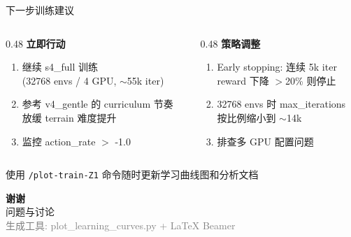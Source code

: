 \documentclass[aspectratio=169, 10pt, xcolor=dvipsnames]{beamer}
\begin{document}
\begin{frame}{下一步训练建议}
  \begin{columns}[T]
    \begin{column}{0.48\textwidth}
      \textbf{立即行动}
      \begin{enumerate}
        \item 继续 s4\_full 训练 \\
              (32768 envs / 4 GPU, $\sim$55k iter)
        \item 参考 v4\_gentle 的 curriculum 节奏 \\
              放缓 terrain 难度提升
        \item 监控 action\_rate $>$ -1.0
      \end{enumerate}
    \end{column}
    \begin{column}{0.48\textwidth}
      \textbf{策略调整}
      \begin{enumerate}
        \item Early stopping: 连续 5k iter \\
              reward 下降 $>$20\% 则停止
        \item 32768 envs 时 max\_iterations \\
              按比例缩小到 $\sim$14k
        \item 排查多 GPU 配置问题
      \end{enumerate}
    \end{column}
  \end{columns}

  \vspace{0.5cm}
  \centering
  \begin{block}{}
    \centering
    \small 使用 \texttt{/plot-train-Z1} 命令随时更新学习曲线图和分析文档
  \end{block}
\end{frame}

\begin{frame}[plain]
  \centering
  \vfill
  {\Huge\bfseries 谢谢} \\[1cm]
  {\large 问题与讨论} \\[0.5cm]
  {\small\textcolor{gray}{生成工具: plot\_learning\_curves.py + LaTeX Beamer}}
  \vfill
\end{frame}
\end{document}
